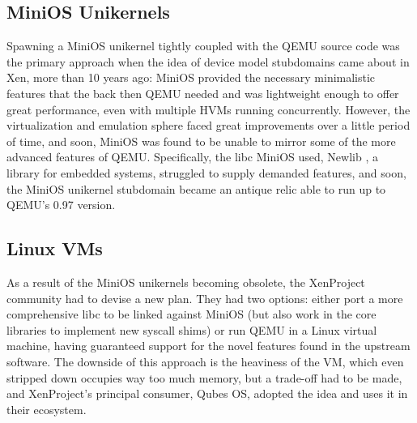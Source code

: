 
\subsection{MiniOS Unikernels}
\label{subsec:minios-unikernels}

Spawning a MiniOS unikernel tightly coupled with the QEMU source code was the primary approach when the idea of device model stubdomains came about in Xen, more than 10 years ago: MiniOS provided the necessary minimalistic features that the back then QEMU needed and was lightweight enough to offer great performance, even with multiple HVMs running concurrently.
However, the virtualization and emulation sphere faced great improvements over a little period of time, and soon, MiniOS was found to be unable to mirror some of the more advanced features of QEMU.
Specifically, the libc MiniOS used, Newlib \cite{newlib}, a library for embedded systems, struggled to supply demanded features, and soon, the MiniOS unikernel stubdomain became an antique relic able to run up to QEMU's 0.97 version.

\subsection{Linux VMs}
\label{subsec:linux-vms}

As a result of the MiniOS unikernels becoming obsolete, the XenProject community had to devise a new plan.
They had two options: either port a more comprehensive libc to be linked against MiniOS (but also work in the core libraries to implement new syscall shims) or run QEMU in a Linux virtual machine, having guaranteed support for the novel features found in the upstream software.
The downside of this approach is the heaviness of the VM, which even stripped down occupies way too much memory, but a trade-off had to be made, and XenProject's principal consumer, Qubes OS, adopted the idea and uses it in their ecosystem.

